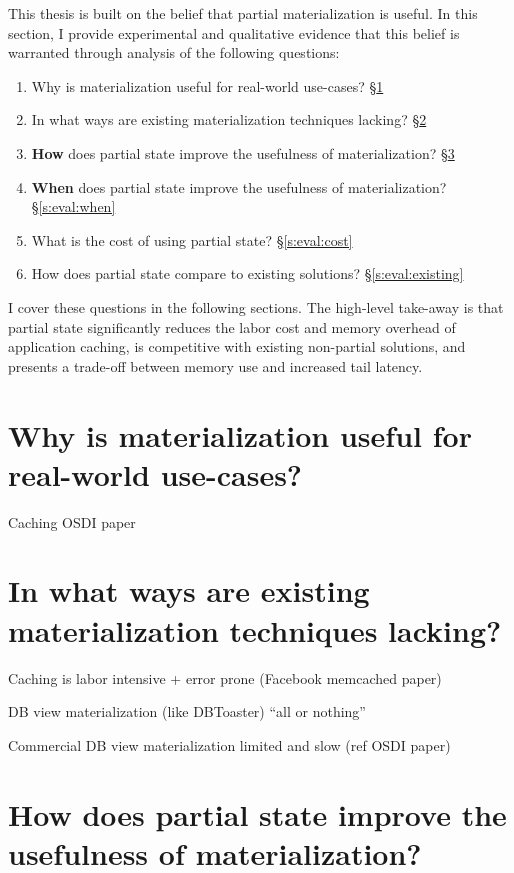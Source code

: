 This thesis is built on the belief that partial materialization is
useful. In this section, I provide experimental and qualitative evidence
that this belief is warranted through analysis of the following
questions:

\begin{enumerate}
 \item Why is materialization useful for real-world use-cases? \S\ref{s:eval:materialization}
 \item In what ways are existing materialization techniques lacking? \S\ref{s:eval:lacking}
 \item \textbf{How} does partial state improve the usefulness of materialization? \S\ref{s:eval:how}
 \item \textbf{When} does partial state improve the usefulness of materialization? \S\ref{s:eval:when}
 \item What is the cost of using partial state? \S\ref{s:eval:cost}
 \item How does partial state compare to existing solutions? \S\ref{s:eval:existing}
\end{enumerate}

I cover these questions in the following sections. The high-level
take-away is that partial state significantly reduces the labor cost and
memory overhead of application caching, is competitive with existing
non-partial solutions, and presents a trade-off between memory use and
increased tail latency.

\section{Why is materialization useful for real-world use-cases?}
\label{s:eval:materialization}

Caching
OSDI paper

\section{In what ways are existing materialization techniques lacking?}
\label{s:eval:lacking}

Caching is labor intensive + error prone (Facebook memcached paper)

DB view materialization (like DBToaster) ``all or nothing''

Commercial DB view materialization limited and slow (ref OSDI paper)

\section{How does partial state improve the usefulness of materialization?}
\label{s:eval:how}

